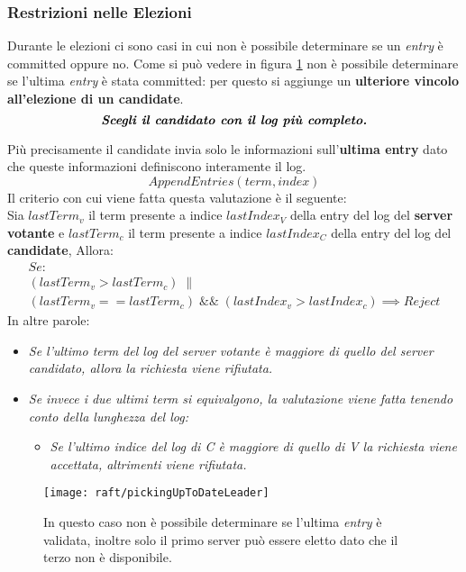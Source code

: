   \subsubsection{Restrizioni nelle Elezioni}
  Durante le elezioni ci sono casi in cui non è possibile determinare se un \textit{entry} è committed oppure no. Come si può vedere in figura \ref{fig:figure10} non è possibile determinare se l'ultima \textit{entry} è stata committed: per questo si aggiunge un \textbf{ulteriore vincolo all'elezione di un candidate}.
  \[
    \emph{\textbf{Scegli il candidato con il log più completo.}}
  \]

  Più precisamente il candidate invia solo le informazioni sull'\textbf{ultima entry} dato che queste informazioni definiscono interamente il log.
 \[
      AppendEntries(term, index)
  \]
  Il criterio con cui viene fatta questa valutazione è il seguente:\\
  Sia $lastTerm_v$ il term presente a indice $lastIndex_V$ della entry del log del \textbf{server votante} e $lastTerm_c$ il term presente a indice $lastIndex_C$ della entry del log del \textbf{candidate}, Allora:
  \begin{equation} \label{eq:1}
    \begin{multlined}
    Se:\\
      (lastTerm_v > lastTerm_c) \; \| \;        \\
      (lastTerm_v == lastTerm_c)  \; \&\& \;
      (lastIndex_v > lastIndex_c)
    \implies Reject
    \end{multlined}
  \end{equation}
  In altre parole:
  \begin{itemize}
    \item{\emph{Se l'ultimo term del log del server votante è maggiore di quello del server candidato, allora la  richiesta viene rifiutata. }}
    \item{\emph{Se invece i due ultimi term si equivalgono, la valutazione viene fatta tenendo conto della lunghezza del log:}}
    \begin{itemize}
      \item{\emph{Se l'ultimo indice del log di C è maggiore di quello di V la richiesta viene accettata, altrimenti viene rifiutata.}}
    \end{itemize}
  \end{itemize}
 
  \begin{figure}[H]
  	\centering
  	\texttt{[image: raft/pickingUpToDateLeader]}
  	\captionsetup{singlelinecheck=off}
  	\caption[stateDiagramCaption]{
	 In questo caso non è possibile determinare se l'ultima \textit{entry} è validata, inoltre solo il primo server può essere eletto dato che il terzo non è disponibile.}
  	\label{fig:figure10}
  \end{figure}

